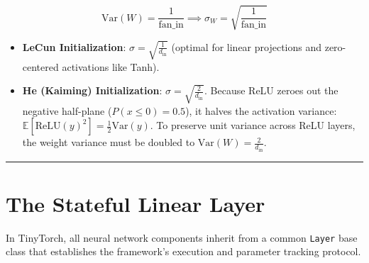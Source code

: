 \documentclass[
  letterpaper,
]{scrbook}
\providecommand{\tightlist}{%
  \setlength{\itemsep}{0pt}\setlength{\parskip}{0pt}}
\begin{document}
\[\text{Var}(W) = \frac{1}{\text{fan\_in}} \implies \sigma_W = \sqrt{\frac{1}{\text{fan\_in}}}\]

\begin{itemize}
\tightlist
\item
  \textbf{LeCun Initialization}:
  \(\sigma = \sqrt{\frac{1}{d_{\text{in}}}}\) (optimal for linear
  projections and zero-centered activations like Tanh).
\item
  \textbf{He (Kaiming) Initialization}:
  \(\sigma = \sqrt{\frac{2}{d_{\text{in}}}}\). Because ReLU zeroes out
  the negative half-plane (\(P(x \le 0) = 0.5\)), it halves the
  activation variance:
  \(\mathbb{E}[\text{ReLU}(y)^2] = \frac{1}{2}\text{Var}(y)\). To
  preserve unit variance across ReLU layers, the weight variance must be
  doubled to \(\text{Var}(W) = \frac{2}{d_{\text{in}}}\).
\end{itemize}

\begin{center}\rule{0.5\linewidth}{0.5pt}\end{center}

\section{The Stateful Linear Layer}\label{the-stateful-linear-layer}

In TinyTorch, all neural network components inherit from a common
\texttt{Layer} base class that establishes the framework's execution and
parameter tracking protocol.
\end{document}
